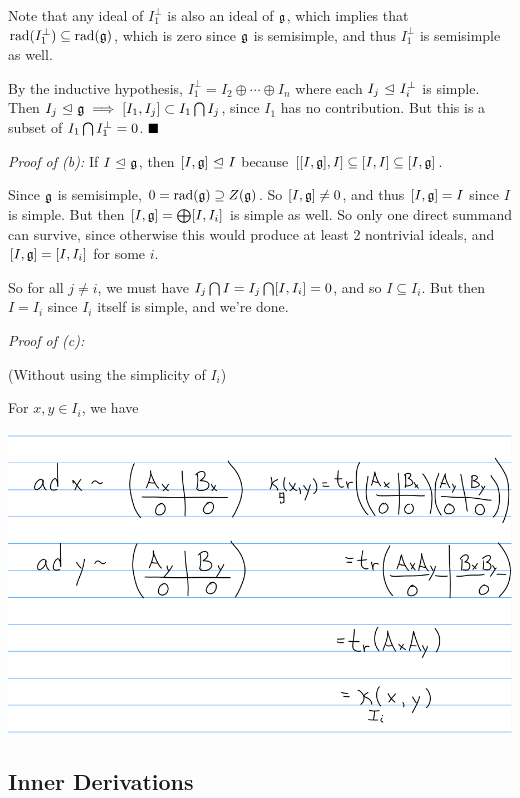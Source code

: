 Note that any ideal of \(I_1^\perp\) is also an ideal of \({\mathfrak{g}}\),
which implies that
\(\mathrm{rad}(I_1^\perp) \subseteq \mathrm{rad}({\mathfrak{g}})\), which is zero
since \({\mathfrak{g}}\) is semisimple, and thus \(I_1^\perp\) is semisimple as
well.

By the inductive hypothesis,
\(I_1^\perp = I_2 \oplus \cdots \oplus I_n\) where each
\(I_j {~\trianglelefteq~} I_i^\perp\) is simple. Then
\(I_j {~\trianglelefteq~} {\mathfrak{g}} \implies [I_1, I_j] \subset I_1 \bigcap I_j\),
since \(I_1\) has no contribution. But this is a subset of
\(I_1 \bigcap I_1^\perp = 0\). \(\qed\)

\emph{Proof of (b):} If \(I {~\trianglelefteq~} {\mathfrak{g}}\), then
\([I, {\mathfrak{g}}] {~\trianglelefteq~} I\) because
\([[I, {\mathfrak{g}}], I] \subseteq [I, I] \subseteq [I, {\mathfrak{g}}]\).

Since \({\mathfrak{g}}\) is semisimple,
\(0 = \mathrm{rad}({\mathfrak{g}}) \supseteq Z({\mathfrak{g}})\). So
\([I, {\mathfrak{g}}] \neq 0\), and thus \([I, {\mathfrak{g}}] = I\) since \(I\) is
simple. But then \([I, {\mathfrak{g}}] = \bigoplus [I, I_i]\) is simple as well.
So only one direct summand can survive, since otherwise this would
produce at least 2 nontrivial ideals, and \([I, {\mathfrak{g}}] = [I, I_i]\) for
some \(i\).

So for all \(j\neq i\), we must have
\(I_j \bigcap I = I_j \bigcap [I, I_i] = 0\), and so
\(I \subseteq I_i\). But then \(I = I_i\) since \(I_i\) itself is
simple, and we're done.

\emph{Proof of (c):}

(Without using the simplicity of \(I_i\))

For \(x,y\in I_i\), we have

\includegraphics{figures/2019-09-09-09:45.png}\\

\hypertarget{inner-derivations}{%
\subsection{Inner Derivations}\label{inner-derivations}}

